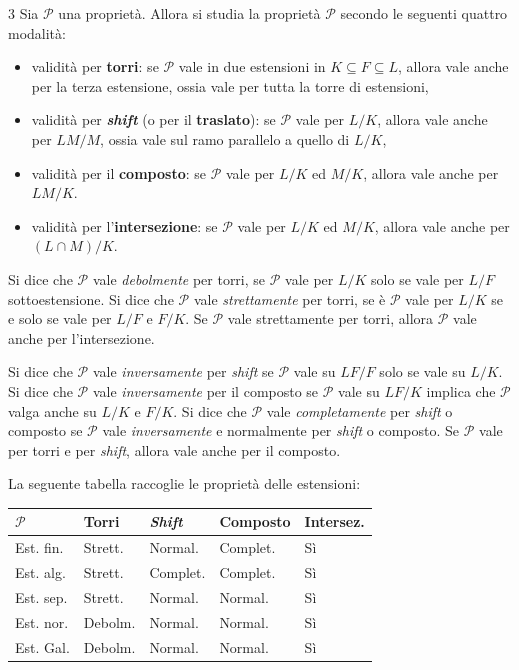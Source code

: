 \documentclass[10pt,landscape]{article}
\begin{document}
\begin{multicols}{3}
	Sia $\mathcal{P}$ una proprietà. Allora si
	studia la proprietà $\mathcal{P}$ secondo
	le seguenti quattro modalità:
	\begin{itemize}
		\item validità per \textbf{torri}: se $\mathcal{P}$ vale in due estensioni in $K \subseteq F \subseteq L$, allora vale anche per la terza estensione, ossia
		      vale per tutta la torre di estensioni,
		\item validità per \textbf{\textit{shift}} (o per il \textbf{traslato}): se $\mathcal{P}$ vale
		      per $L / K$, allora vale anche per $LM / M$, ossia
		      vale sul ramo parallelo a quello di $L / K$,
		\item validità per il \textbf{composto}: se
		      $\mathcal{P}$ vale per $L / K$ ed $M / K$, allora
		      vale anche per $LM / K$.
		\item validità per l'\textbf{intersezione}:
		      se $\mathcal{P}$ vale per $L / K$ ed $M / K$,
		      allora vale anche per $(L \cap M) / K$.
	\end{itemize}
	Si dice che $\mathcal{P}$ vale \textit{debolmente}
	per torri, se $\mathcal{P}$ vale per $L / K$ solo
	se vale per $L / F$ sottoestensione.
	Si dice che $\mathcal{P}$ vale \textit{strettamente}
	per torri, se è $\mathcal{P}$ vale per $L / K$ se
	e solo se vale per $L / F$ e $F / K$. Se $\mathcal{P}$ vale strettamente per torri, allora $\mathcal{P}$
	vale anche per l'intersezione. \smallskip

	Si dice che
	$\mathcal{P}$ vale \textit{inversamente} per
	\textit{shift} se $\mathcal{P}$ vale su
	$LF / F$ solo se vale su $L / K$. Si dice che
	$\mathcal{P}$ vale \textit{inversamente} per
	il composto se $\mathcal{P}$ vale su $LF / K$
	implica che $\mathcal{P}$ valga anche su $L / K$
	e $F / K$. Si dice che $\mathcal{P}$ vale \textit{completamente} per \textit{shift} o composto se $\mathcal{P}$
	vale \textit{inversamente} e normalmente per \textit{shift} o
	composto. Se $\mathcal{P}$ vale per torri e
	per \textit{shift}, allora vale anche per il
	composto. \smallskip

	La seguente tabella raccoglie le proprietà
	delle estensioni: \smallskip

	\begin{center}
		\scriptsize
		\vskip -0.1in
		\begin{tabular}{l|l|l|l|l}
			\hline
			$\mathcal{P}$ & Torri   & \textit{Shift} & Composto & Intersez. \\ \hline
			Est. fin.     & Strett. & Normal.        & Complet. & Sì        \\ \hline
			Est. alg.     & Strett. & Complet.       & Complet. & Sì        \\ \hline
			Est. sep.     & Strett. & Normal.        & Normal.  & Sì        \\ \hline
			Est. nor.     & Debolm. & Normal.        & Normal.  & Sì        \\ \hline
			Est. Gal.     & Debolm. & Normal.        & Normal.  & Sì
		\end{tabular}
	\end{center}


\end{multicols}
\end{document}
